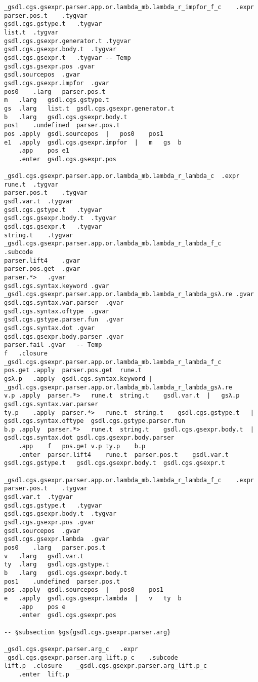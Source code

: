 \documentclass{report}
\begin{document}
\begin{verbatim}
_gsdl.cgs.gsexpr.parser.app.or.lambda_mb.lambda_r_impfor_f_c	.expr
parser.pos.t	.tygvar
gsdl.cgs.gstype.t	.tygvar
list.t	.tygvar
gsdl.cgs.gsexpr.generator.t	.tygvar
gsdl.cgs.gsexpr.body.t	.tygvar
gsdl.cgs.gsexpr.t	.tygvar	-- Temp
gsdl.cgs.gsexpr.pos	.gvar
gsdl.sourcepos	.gvar
gsdl.cgs.gsexpr.impfor	.gvar
pos0	.larg	parser.pos.t
m	.larg	gsdl.cgs.gstype.t
gs	.larg	list.t	gsdl.cgs.gsexpr.generator.t
b	.larg	gsdl.cgs.gsexpr.body.t
pos1	.undefined	parser.pos.t
pos	.apply	gsdl.sourcepos	|	pos0	pos1
e1	.apply	gsdl.cgs.gsexpr.impfor	|	m	gs	b
	.app	pos	e1
	.enter	gsdl.cgs.gsexpr.pos

_gsdl.cgs.gsexpr.parser.app.or.lambda_mb.lambda_r_lambda_c	.expr
rune.t	.tygvar
parser.pos.t	.tygvar
gsdl.var.t	.tygvar
gsdl.cgs.gstype.t	.tygvar
gsdl.cgs.gsexpr.body.t	.tygvar
gsdl.cgs.gsexpr.t	.tygvar
string.t	.tygvar
_gsdl.cgs.gsexpr.parser.app.or.lambda_mb.lambda_r_lambda_f_c	.subcode
parser.lift4	.gvar
parser.pos.get	.gvar
parser.*>	.gvar
gsdl.cgs.syntax.keyword	.gvar
_gsdl.cgs.gsexpr.parser.app.or.lambda_mb.lambda_r_lambda_gsλ.re	.gvar
gsdl.cgs.syntax.var.parser	.gvar
gsdl.cgs.syntax.oftype	.gvar
gsdl.cgs.gstype.parser.fun	.gvar
gsdl.cgs.syntax.dot	.gvar
gsdl.cgs.gsexpr.body.parser	.gvar
parser.fail	.gvar	-- Temp
f	.closure	_gsdl.cgs.gsexpr.parser.app.or.lambda_mb.lambda_r_lambda_f_c
pos.get	.apply	parser.pos.get	rune.t
gsλ.p	.apply	gsdl.cgs.syntax.keyword	|	_gsdl.cgs.gsexpr.parser.app.or.lambda_mb.lambda_r_lambda_gsλ.re
v.p	.apply	parser.*>	rune.t	string.t	gsdl.var.t	|	gsλ.p	gsdl.cgs.syntax.var.parser
ty.p	.apply	parser.*>	rune.t	string.t	gsdl.cgs.gstype.t	|	gsdl.cgs.syntax.oftype	gsdl.cgs.gstype.parser.fun
b.p	.apply	parser.*>	rune.t	string.t	gsdl.cgs.gsexpr.body.t	|	gsdl.cgs.syntax.dot	gsdl.cgs.gsexpr.body.parser
	.app	f	pos.get	v.p	ty.p	b.p
	.enter	parser.lift4	rune.t	parser.pos.t	gsdl.var.t	gsdl.cgs.gstype.t	gsdl.cgs.gsexpr.body.t	gsdl.cgs.gsexpr.t

_gsdl.cgs.gsexpr.parser.app.or.lambda_mb.lambda_r_lambda_f_c	.expr
parser.pos.t	.tygvar
gsdl.var.t	.tygvar
gsdl.cgs.gstype.t	.tygvar
gsdl.cgs.gsexpr.body.t	.tygvar
gsdl.cgs.gsexpr.pos	.gvar
gsdl.sourcepos	.gvar
gsdl.cgs.gsexpr.lambda	.gvar
pos0	.larg	parser.pos.t
v	.larg	gsdl.var.t
ty	.larg	gsdl.cgs.gstype.t
b	.larg	gsdl.cgs.gsexpr.body.t
pos1	.undefined	parser.pos.t
pos	.apply	gsdl.sourcepos	|	pos0	pos1
e	.apply	gsdl.cgs.gsexpr.lambda	|	v	ty	b
	.app	pos	e
	.enter	gsdl.cgs.gsexpr.pos

-- §subsection §gs{gsdl.cgs.gsexpr.parser.arg}

_gsdl.cgs.gsexpr.parser.arg_c	.expr
_gsdl.cgs.gsexpr.parser.arg_lift.p_c	.subcode
lift.p	.closure	_gsdl.cgs.gsexpr.parser.arg_lift.p_c
	.enter	lift.p


\end{verbatim}
\end{document}
